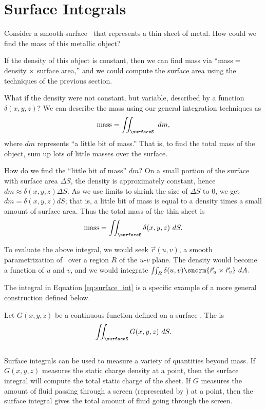 \section{Surface Integrals}\label{sec:surface_integral}

Consider a smooth surface \surfaceS\ that represents a thin sheet of metal. How could we find the mass of this metallic object?

If the density of this object is constant, then we can find mass via ``mass$=$ density $\times$ surface area,'' and we could compute the surface area using the techniques of the previous section. 

What if the density were not constant, but variable, described by a function $\delta(x,y,z)$? We can describe the mass using our general integration techniques as
$$\text{mass} = \iint_\surfaceS \ dm,$$
where $dm$ represents ``a little bit of mass.'' That is, to find the total mass of the object, sum up lots of little masses over the surface.

How do we find the ``little bit of mass'' $dm$? On a small portion of the surface with surface area $\Delta S$, the density is approximately constant, hence $dm \approx \delta(x,y,z)\Delta S$. As we use limits to shrink the size of $\Delta S$ to 0, we get $dm = \delta(x,y,z)dS$; that is, a little bit of mass is equal to a density times a small amount of surface area. Thus the total mass of the thin sheet is
\begin{equation}
\text{mass} =\iint_\surfaceS \delta(x,y,z)\ dS.\label{eq:surface_int}
\end{equation}

To evaluate the above integral, we would seek $\vec r(u,v)$, a smooth parametrization of \surfaceS\ over a region $R$ of the $u$-$v$ plane. The density would become a function of $u$ and $v$, and we would integrate $\iint_R \delta(u,v)\snorm{\vec r_u\times \vec r_v}\ dA.$

The integral in Equation \eqref{eq:surface_int} is a specific example of a more general construction defined below.

{Let $G(x,y,z)$ be a continuous function defined on a surface \surfaceS. The  is
$$\iint_\surfaceS G(x,y,z)\ dS.$$
}\\

Surface integrals can be used to measure a variety of quantities beyond mass. If $G(x,y,z)$ measures the static charge density at a point, then the surface integral will compute the total static charge of the sheet. If $G$ measures the amount of fluid passing through a screen (represented by \surfaceS) at a point, then the surface integral gives the total amount of fluid going through the screen.


